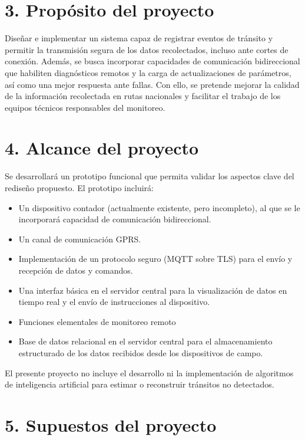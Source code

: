 \documentclass[
11pt, %
]{charter}
\begin{document}
\section{3. Propósito del proyecto}
\label{sec:proposito}

Diseñar e implementar un sistema capaz de registrar eventos de tránsito y permitir la transmisión segura de los datos recolectados, incluso ante cortes de conexión. Además, se busca incorporar capacidades de comunicación bidireccional que habiliten diagnósticos remotos y la carga de actualizaciones de parámetros, así como una mejor respuesta ante fallas. Con ello, se pretende mejorar la calidad de la información recolectada en rutas nacionales y facilitar el trabajo de los equipos técnicos responsables del monitoreo.

\section{4. Alcance del proyecto}
\label{sec:alcance}


Se desarrollará un prototipo funcional que permita validar los aspectos clave del rediseño propuesto.
El prototipo incluirá:

\begin{itemize}
	\item Un dispositivo contador (actualmente existente, pero incompleto), al que se le incorporará capacidad de comunicación bidireccional.
	\item Un canal de comunicación GPRS.
	\item Implementación de un protocolo seguro (MQTT sobre TLS) para el envío y recepción de datos y comandos.
	\item Una interfaz básica en el servidor central para la visualización de datos en tiempo real y el envío de instrucciones al dispositivo.
	\item Funciones elementales de monitoreo remoto
	\item Base de datos relacional en el servidor central para el almacenamiento estructurado de los datos recibidos desde los dispositivos de campo.
	
\end{itemize}

El presente proyecto no incluye el desarrollo ni la implementación de algoritmos de inteligencia artificial para estimar o reconstruir tránsitos no detectados.

\section{5. Supuestos del proyecto}
\label{sec:supuestos}
\end{document}
